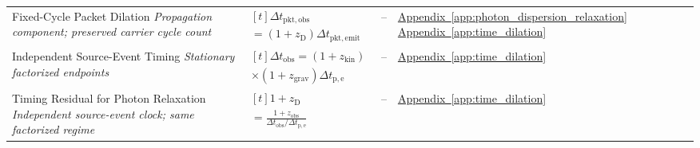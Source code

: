 \begin{longtable}{@{} p{4.5cm} p{6cm} c p{4cm} @{}}
{\raggedright Fixed-Cycle Packet Dilation \newline \textit{Propagation component; preserved carrier cycle count}\par} & {\raggedright $\begin{gathered}[t]\Delta t_{\mathrm{pkt,obs}} \\ =(1+z_{\mathrm D})\Delta t_{\mathrm{pkt,emit}}\end{gathered}$\par} & -- & {\raggedright \hyperref[app:photon_dispersion_relaxation]{Appendix~\ref*{app:photon_dispersion_relaxation}} \newline \hyperref[app:time_dilation]{Appendix~\ref*{app:time_dilation}}\par} \\

{\raggedright Independent Source-Event Timing \newline \textit{Stationary factorized endpoints}\par} & {\raggedright $\begin{gathered}[t]\Delta t_{\mathrm{obs}}=(1+z_{\mathrm{kin}}) \\ \times(1+z_{\mathrm{grav}})\Delta t_{\mathrm{p,e}}\end{gathered}$\par} & -- & {\raggedright \hyperref[app:time_dilation]{Appendix~\ref*{app:time_dilation}}\par} \\

{\raggedright Timing Residual for Photon Relaxation \newline \textit{Independent source-event clock; same factorized regime}\par} & {\raggedright $\begin{gathered}[t]1+z_{\mathrm D} \\ =\frac{1+z_{\mathrm{obs}}}{\Delta t_{\mathrm{obs}}/\Delta t_{\mathrm{p,e}}}\end{gathered}$\par} & -- & {\raggedright \hyperref[app:time_dilation]{Appendix~\ref*{app:time_dilation}}\par} \\


\end{longtable}
